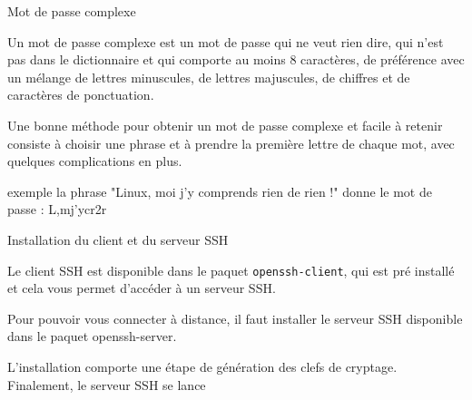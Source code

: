 \documentclass[10pt]{beamer}
\begin{document}
\begin{frame}{Mot de passe complexe}

Un mot de passe complexe est un mot de passe qui ne veut rien dire, qui n'est pas
dans le dictionnaire et qui comporte au moins 8 caractères, de préférence avec un
mélange de lettres minuscules, de lettres majuscules, de chiffres et de caractères
de ponctuation.

\pause

Une bonne méthode pour obtenir un mot de passe complexe et facile à retenir
consiste à choisir une phrase et à prendre la première lettre de chaque mot, avec
quelques complications en plus.

\begin{alertblock}{exemple}
la phrase "Linux, moi j'y comprends rien de rien !" donne le mot de passe : \alert{L,mj'ycr2r}
\end{alertblock}
\end{frame}


\begin{frame}{Installation du client et du serveur SSH}

Le client SSH est disponible dans le paquet \texttt{openssh-client}, qui est pré installé et cela vous permet d'accéder à un serveur SSH. \pause

Pour pouvoir vous connecter à distance, il faut installer le
serveur SSH disponible dans le paquet openssh-server. 
\pause 

L'installation comporte une étape de génération des clefs de cryptage. Finalement,
le serveur SSH se lance

\end{frame}
\end{document}
